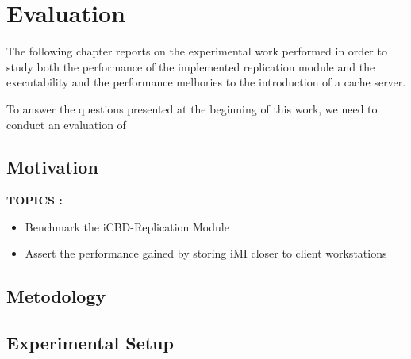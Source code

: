 \chapter{Evaluation}
\label{cha:evaluation}

The following chapter reports on the experimental work performed in order to study both the performance of the implemented replication module and the executability and the performance melhories to the introduction of a cache server.

To answer the questions presented at the beginning of this work, we need to conduct an evaluation of

\section{Motivation}
\label{sec:eval_motivation}

\textbf{TOPICS :}
\begin{itemize}
	\item Benchmark the iCBD-Replication Module
	\item Assert the performance gained by storing iMI closer to client workstations
\end{itemize}



\section{Metodology}
\label{sec:eval_method}

\section{Experimental Setup}
\label{sec:eval_exp_setup}

